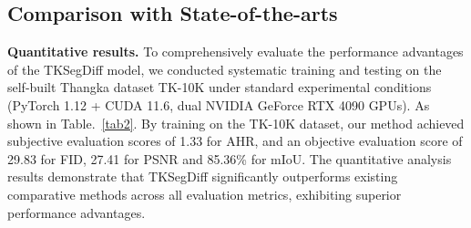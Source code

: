 \documentclass[sn-mathphys]{sn-jnl}%
\theoremstyle{thmstyleone}%
\theoremstyle{thmstyletwo}%
\theoremstyle{thmstylethree}%
\begin{document}
\subsection{Comparison with State-of-the-arts}
\textbf{Quantitative results.} To comprehensively evaluate the performance advantages of the TKSegDiff model, we conducted systematic training and testing on the self-built Thangka dataset TK-10K under standard experimental conditions (PyTorch 1.12 + CUDA 11.6, dual NVIDIA GeForce RTX 4090 GPUs). As shown in Table.~\ref{tab2}. By training on the TK-10K dataset, our method achieved subjective evaluation scores of 1.33 for AHR, and an objective evaluation score of 29.83 for FID, 27.41 for PSNR and 85.36\% for mIoU. The quantitative analysis results demonstrate that TKSegDiff significantly outperforms existing comparative methods across all evaluation metrics, exhibiting superior performance advantages.
\end{document}
